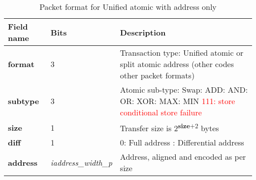\begin{table}[htp]
  \centering
  \caption{Packet format for Unified atomic with address only}
  \label{tab:te_datadx0y6}
  \begin{tabulary}{\textwidth}{|l|p{40mm}|p{90mm}|}
    \hline
    {\bf Field name} & {\bf Bits} & {\bf Description} \\
    \hline
    \textbf{format} & 	3	& Transaction type: Unified atomic or split atomic address\newline	
		(other codes other packet formats)\\
    \hline
    \textbf{subtype} & 	3	& Atomic sub-type: Swap: ADD: AND: OR: XOR: MAX: MIN\newline	
		\textcolor{red}{111: store conditional store failure}\\	
    \hline
    \textbf{size} & 1 & Transfer size is 2\textsuperscript{\textbf{size}+2} bytes\\
    \hline
    \textbf{diff} & 1 & 0: Full address : Differential address\\
    \hline
    \textbf{address} &  \textit{iaddress\_width\_p} & Address, aligned and encoded as per size \\
    \hline
  \end{tabulary}
\end{table}


